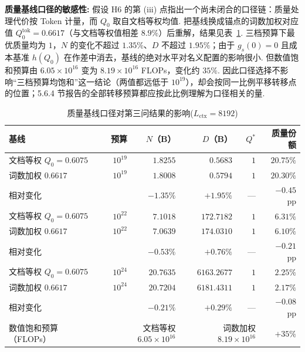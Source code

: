 \textbf{质量基线口径的敏感性:}\label{par:q3-quality-baseline} 假设 H6 的第 (iii) 点指出一个尚未闭合的口径链：质量处理代价按 Token 计量，而 $Q_0$ 取自文档等权均值. 把基线换成锚点的词数加权对应值 $Q_0^{\mathrm{tok}}=0.6617$（与文档等权值相差 $8.9\%$）后重解，结果见表~\ref{tab:q3-v41-q0}. 三档预算下最优质量均为 $1$，$N$ 的变化不超过 $1.35\%$、$D$ 不超过 $1.95\%$；由于 $g_s(0)=0$ 且成本基准 $h(Q_0)$ 在作差中消去，基线的绝对水平对名义配置的影响很小. 但数值饱和预算由 $6.05\times10^{16}$ 变为 $8.19\times10^{16}$ FLOPs，变化约 $35\%$. 因此口径选择不影响“三档预算均饱和”这一结论（两值都远低于 $10^{19}$），却会按同一比例平移转移点的位置；5.6.4 节报告的全部转移预算都应按此比例理解为口径相关的量. 
\begin{table}[htbp]\centering\small
    \caption{质量基线口径对第三问结果的影响($L_{\mathrm{ctx}}=8192$)}\label{tab:q3-v41-q0}
    \begin{tabular}{lrrrrr}\toprule
        基线                & 预算                                           & $N$（B）                                       & $D$（B）      & $Q^*$ & 质量份额       \\\midrule
        文档等权 $Q_0=0.6075$ & $10^{19}$                                    & $1.8255$                                     & $0.5683$    & $1$   & $20.75\%$  \\
        词数加权 $0.6617$     & $10^{19}$                                    & $1.8008$                                     & $0.5794$    & $1$   & $20.30\%$  \\
        相对变化              &                                              & $-1.35\%$                                    & $+1.95\%$   & ---   & $-0.45$ pp \\\midrule
        文档等权 $Q_0=0.6075$ & $10^{22}$                                    & $7.1018$                                     & $172.7182$  & $1$   & $6.31\%$   \\
        词数加权 $0.6617$     & $10^{22}$                                    & $7.0639$                                     & $174.0310$  & $1$   & $6.10\%$   \\
        相对变化              &                                              & $-0.53\%$                                    & $+0.76\%$   & ---   & $-0.21$ pp \\\midrule
        文档等权 $Q_0=0.6075$ & $10^{24}$                                    & $20.7635$                                    & $6163.2677$ & $1$   & $2.25\%$   \\
        词数加权 $0.6617$     & $10^{24}$                                    & $20.7204$                                    & $6181.4311$ & $1$   & $2.17\%$   \\
        相对变化              &                                              & $-0.21\%$                                    & $+0.29\%$   & ---   & $-0.08$ pp \\\midrule
        数值饱和预算（FLOPs）     & \multicolumn{2}{r}{文档等权 $6.05\times10^{16}$} & \multicolumn{2}{r}{词数加权 $8.19\times10^{16}$} & $+35\%$                          \\\bottomrule
    \end{tabular}\end{table}

